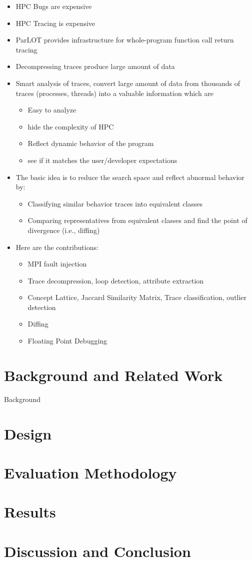 \documentclass[review,sigconf]{acmart}
\begin{document}
\begin{itemize}
\item HPC Bugs are expensive
\item HPC Tracing is expensive
\item ParLOT provides infrastructure for whole-program function call return tracing
\item Decompressing traces produce large amount of data
\item Smart analysis of traces, convert large amount of data from thousands of traces (processes, threads) into a valuable information which are
	\begin{itemize}
	\item Easy to analyze
	\item hide the complexity of HPC
	\item Reflect dynamic behavior of the program
	\item see if it matches the user/developer expectations
	\end{itemize}
\item The basic idea is to reduce the search space and reflect abnormal behavior by:
	\begin{itemize}
	\item Classifying similar behavior traces into equivalent classes
	\item Comparing representatives from equivalent classes and find the point of divergence (i.e., diffing)
	\end{itemize}
\item Here are the contributions:
	\begin{itemize}
	\item MPI fault injection
	\item Trace decompression, loop detection, attribute extraction
	\item Concept Lattice, Jaccard Similarity Matrix, Trace classification, outlier detection
	\item Diffing
	\item Floating Point Debugging
	\end{itemize}
\end{itemize}

\section{Background and Related Work}
\label{sec:bgreltool}
Background


\section{Design }
\label{sec:design}
%

\section{Evaluation Methodology}
\label{sec:evalmeth}
%

\section{Results}
\label{sec:results}


    

\section{Discussion and Conclusion}
\label{sec:concl}
%




\end{document}
